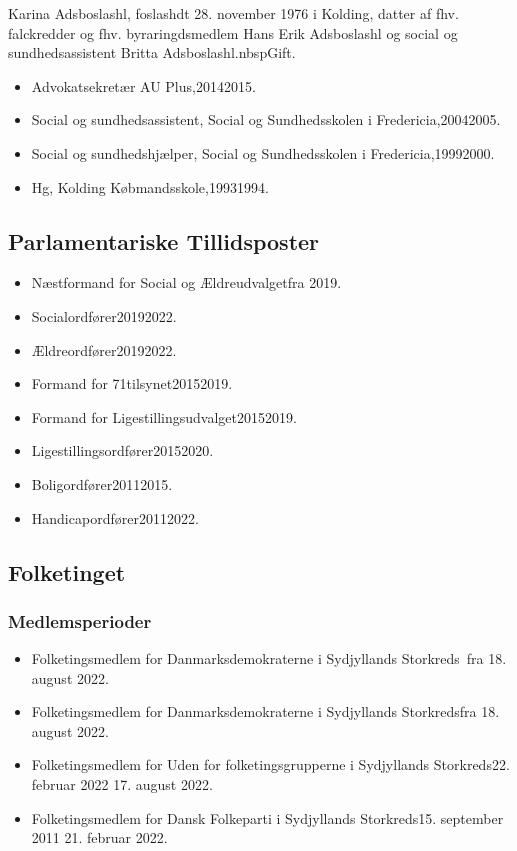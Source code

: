 \documentclass[11pt, a4paper]{awesome-cv}
\begin{document}
\makecvheader[R]
\makelettertitle
\begin{cvletter}
Karina Adsboslashl, foslashdt 28. november 1976 i Kolding, datter af fhv. falckredder og fhv. byraringdsmedlem Hans Erik Adsboslashl og social og sundhedsassistent Britta Adsboslashl.nbspGift.

\begin{itemize}
\item Advokatsekretær AU Plus,20142015.
\item Social og sundhedsassistent, Social og Sundhedsskolen i Fredericia,20042005.
\item Social og sundhedshjælper, Social og Sundhedsskolen i Fredericia,19992000.
\item Hg, Kolding Købmandsskole,19931994.
\end{itemize}
\subsection*{Parlamentariske Tillidsposter}
\begin{itemize}
\item Næstformand for Social og Ældreudvalgetfra 2019.
\item Socialordfører20192022.
\item Ældreordfører20192022.
\item Formand for  71tilsynet20152019.
\item Formand for Ligestillingsudvalget20152019.
\item Ligestillingsordfører20152020.
\item Boligordfører20112015.
\item Handicapordfører20112022.
\end{itemize}
\subsection*{Folketinget}
\subsubsection*{Medlemsperioder}
\begin{itemize}
\item Folketingsmedlem for Danmarksdemokraterne i Sydjyllands Storkreds fra 18. august 2022.
\item Folketingsmedlem for Danmarksdemokraterne i Sydjyllands Storkredsfra 18. august 2022.
\item Folketingsmedlem for Uden for folketingsgrupperne i Sydjyllands Storkreds22. februar 2022  17. august 2022.
\item Folketingsmedlem for Dansk Folkeparti i Sydjyllands Storkreds15. september 2011  21. februar 2022.
\end{itemize}

\end{cvletter}
\end{document}
